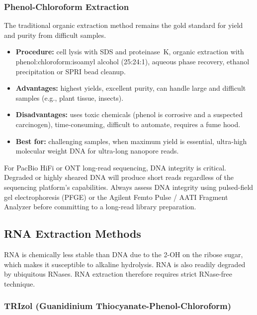 \subsubsection{Phenol-Chloroform Extraction}

The traditional organic extraction method remains the gold standard for yield and purity from difficult samples.

\begin{itemize}[nosep]
  \item \textbf{Procedure:} cell lysis with SDS and proteinase~K, organic extraction with phenol:chloroform:isoamyl alcohol (25:24:1), aqueous phase recovery, ethanol precipitation or SPRI bead cleanup.
  \item \textbf{Advantages:} highest yields, excellent purity, can handle large and difficult samples (e.g., plant tissue, insects).
  \item \textbf{Disadvantages:} uses toxic chemicals (phenol is corrosive and a suspected carcinogen), time-consuming, difficult to automate, requires a fume hood.
  \item \textbf{Best for:} challenging samples, when maximum yield is essential, ultra-high molecular weight DNA for ultra-long nanopore reads.
\end{itemize}

\begin{warningbox}[title={DNA Integrity for Long-Read Sequencing}]
For PacBio HiFi or ONT long-read sequencing, DNA integrity is critical. Degraded or highly sheared DNA will produce short reads regardless of the sequencing platform's capabilities. Always assess DNA integrity using pulsed-field gel electrophoresis (PFGE) or the Agilent Femto Pulse / AATI Fragment Analyzer before committing to a long-read library preparation.
\end{warningbox}

\subsection{RNA Extraction Methods}

RNA is chemically less stable than DNA due to the 2\textquotesingle-OH on the ribose sugar, which makes it susceptible to alkaline hydrolysis. RNA is also readily degraded by ubiquitous RNases. RNA extraction therefore requires strict RNase-free technique.

\subsubsection{TRIzol (Guanidinium Thiocyanate-Phenol-Chloroform)}

